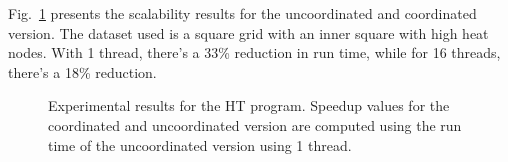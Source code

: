 Fig.~\ref{results:ht} presents the scalability results for the uncoordinated
and coordinated version. The dataset used is a square grid with an inner square
with high heat nodes. With 1 thread, there's a 33\% reduction in run time, while
for 16 threads, there's a 18\% reduction.

\begin{figure}[ht!]
   \begin{center}
   \end{center}
   \caption{Experimental results for the HT program. Speedup values for the
      coordinated and uncoordinated version are computed using the run time of
      the uncoordinated version using 1 thread.}
   \label{results:ht}
\end{figure}
